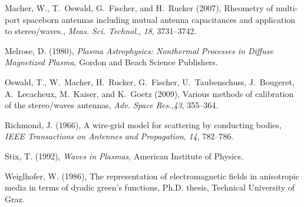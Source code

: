 \documentclass[two-column,ras]{agutex}
\begin{document}
\begin{article}
\begin{thebibliography}{}
Macher, W., T.~Oswald, G.~Fischer, and H.~Rucker (2007), Rheometry of
  multi-port spaceborn antennas including mutual antenna capacitances and
  application to stereo/waves., \textit{Meas. Sci. Technol.}, \textit{18},
  3731--3742.

Melrose, D. (1980), \textit{Plasma Astrophysics: Nonthermal Processes in
  Diffuse Magnetized Plasma}, Gordon and Beach Science Publishers.

Oswald, T., W.~Macher, H.~Rucker, G.~Fischer, U.~Taubenschuss, J.~Bougeret,
  A.~Lecacheux, M.~Kaiser, and K.~Goetz (2009), Various methods of calibration
  of the stereo/waves antennas, \textit{Adv. Space Res.},\textit{43},
  355--364.

Richmond, J. (1966), A wire-grid model for scattering by conducting bodies,
  \textit{IEEE Transactions on Antennes and Propagation}, \textit{14},
  782--786.

Stix, T. (1992), \textit{Waves in Plasmas}, American Institute of Physics.

Weiglhofer, W. (1986), The representation of electromagnetic fields in
  anisotropic media in terms of dyadic green's functions, Ph.D. thesis,
  Technical University of Graz.


\end{thebibliography}





%
%

\end{article}




\end{document}
